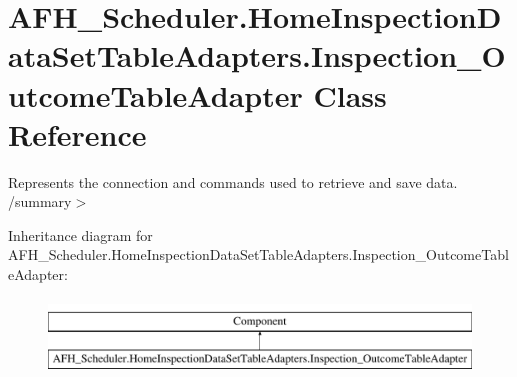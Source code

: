 \section{A\+F\+H\+\_\+\+Scheduler.\+Home\+Inspection\+Data\+Set\+Table\+Adapters.\+Inspection\+\_\+\+Outcome\+Table\+Adapter Class Reference}
\label{class_a_f_h___scheduler_1_1_home_inspection_data_set_table_adapters_1_1_inspection___outcome_table_adapter}


Represents the connection and commands used to retrieve and save data. /summary$>$  


Inheritance diagram for A\+F\+H\+\_\+\+Scheduler.\+Home\+Inspection\+Data\+Set\+Table\+Adapters.\+Inspection\+\_\+\+Outcome\+Table\+Adapter\+:\begin{figure}[H]
\begin{center}
\leavevmode
\includegraphics[height=2.000000cm]{class_a_f_h___scheduler_1_1_home_inspection_data_set_table_adapters_1_1_inspection___outcome_table_adapter}
\end{center}
\end{figure}
